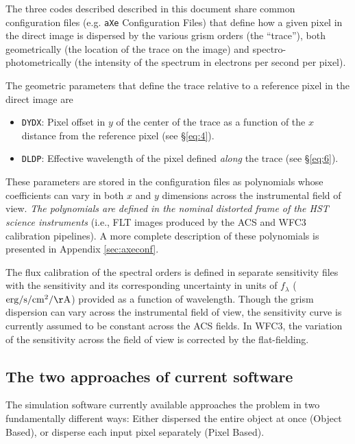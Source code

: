 \documentclass[preprint]{aastex}
\begin{document}
The three codes described described in this document share common configuration files (e.g. \texttt{aXe} Configuration Files) that define how a given pixel in the direct image is dispersed by the various grism orders (the ``trace''), both geometrically (the location of the trace on the image) and spectro-photometrically (the intensity of the spectrum in electrons per second per pixel). 

The geometric parameters that define the trace relative to a reference pixel in the direct image are 
\begin{itemize}
    \item \texttt{DYDX}: Pixel offset in $y$ of the center of the trace as a function of the $x$ distance from the reference pixel (see \S\ref{eq:4}).
    
    \item \texttt{DLDP}: Effective wavelength of the pixel defined \textit{along} the trace (see \S\ref{eq:6}). 
\end{itemize}

These parameters are stored in the configuration files as polynomials whose coefficients can vary in both $x$ and $y$ dimensions across the instrumental field of view.  \textit{The polynomials are defined in the nominal distorted frame of the \textit{HST} science instruments} (i.e., FLT images produced by the ACS and WFC3 calibration pipelines). A more complete description of these polynomials is presented in Appendix \ref{sec:axeconf}.

The flux calibration of the spectral orders is defined in separate sensitivity files with the sensitivity and its corresponding uncertainty in units of $f_\lambda$ ($\mathrm{erg/s/cm^2/\AA}$) provided as a function of wavelength.  Though the grism dispersion can vary across the instrumental field of view, the sensitivity curve is currently assumed to be constant across the ACS fields. In WFC3, the variation of the sensitivity across the field of view is corrected by the flat-fielding.



\subsection{The two approaches of current software}
The simulation software currently available approaches the problem in two fundamentally different ways: Either dispersed the entire object at once (Object Based), or disperse each input pixel separately (Pixel Based).
\end{document}
